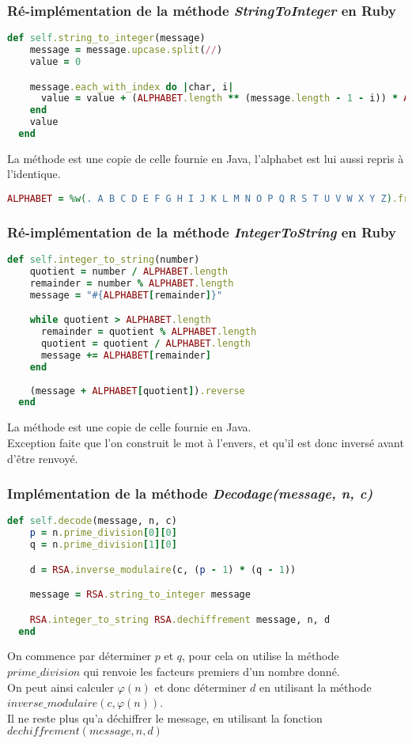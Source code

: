 \documentclass[a4paper,10pt]{article}
\begin{document}
\subsubsection{Ré-implémentation de la méthode \textit{StringToInteger} en Ruby}
\begin{lstlisting}[language=Ruby]
  def self.string_to_integer(message)
    message = message.upcase.split(//)
    value = 0

    message.each_with_index do |char, i|
      value = value + (ALPHABET.length ** (message.length - 1 - i)) * ALPHABET.index(char)
    end
    value
  end
\end{lstlisting}
La méthode est une copie de celle fournie en Java, l'alphabet est lui aussi repris à l'identique.\\
\begin{lstlisting}[language=Ruby]
  ALPHABET = %w(. A B C D E F G H I J K L M N O P Q R S T U V W X Y Z).freeze
\end{lstlisting}
\bigskip

\subsubsection{Ré-implémentation de la méthode \textit{IntegerToString} en Ruby}
\begin{lstlisting}[language=Ruby]
  def self.integer_to_string(number)
    quotient = number / ALPHABET.length
    remainder = number % ALPHABET.length
    message = "#{ALPHABET[remainder]}"

    while quotient > ALPHABET.length
      remainder = quotient % ALPHABET.length
      quotient = quotient / ALPHABET.length
      message += ALPHABET[remainder]
    end
    
    (message + ALPHABET[quotient]).reverse
  end
\end{lstlisting}
La méthode est une copie de celle fournie en Java.\\
Exception faite que l'on construit le mot à l'envers, et qu'il est donc inversé avant d'être renvoyé. 

\clearpage
\subsubsection{Implémentation de la méthode \textit{Decodage(message, n, c)}}
\begin{lstlisting}[language=Ruby]
  def self.decode(message, n, c)
    p = n.prime_division[0][0]
    q = n.prime_division[1][0]

    d = RSA.inverse_modulaire(c, (p - 1) * (q - 1))

    message = RSA.string_to_integer message

    RSA.integer_to_string RSA.dechiffrement message, n, d
  end
\end{lstlisting}
On commence par déterminer $p$ et $q$, pour cela on utilise la méthode $prime\_division$ qui renvoie les facteurs premiers d'un nombre donné.\\
On peut ainsi calculer $\varphi(n)$ et donc déterminer $d$ en utilisant la méthode $inverse\_modulaire(c, \varphi(n))$.\\
Il ne reste plus qu'a déchiffrer le message, en utilisant la fonction $dechiffrement(message, n, d)$
\end{document}
